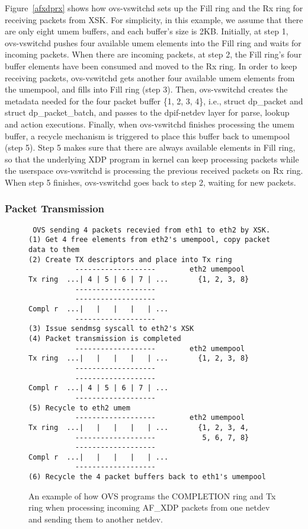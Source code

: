 \documentclass[10pt]{sigplanconf}
\begin{document}
Figure~\ref{afxdprx} shows how ovs-vswitchd sets up the Fill ring and
the Rx ring for receiving packets from XSK.  For simplicity, in this example,
we assume that there are only eight umem buffers, and each buffer's
size is 2KB.  Initially, at step 1, ovs-vswitchd pushes four available umem
elements into
the Fill ring and waits for incoming packets.  When there are incoming packets,
at step 2, the Fill ring's four buffer elements have been consumed and moved
to the Rx ring.  In order to keep receiving packets, ovs-vswitchd gets another
four available umem elements from the umempool, and fills into Fill ring (step 3).
Then, ovs-vswitchd creates the metadata needed for the four packet
buffer \{1, 2, 3, 4\}, i.e., struct dp\_packet and struct dp\_packet\_batch, and passes to 
the dpif-netdev layer for parse, lookup and action executions.
Finally, when ovs-vswitchd finishes processing the umem buffer, a recycle
mechanism is triggered to place this buffer back to umempool (step 5).
Step 5 makes sure that there are always available elements in Fill ring, so
that the underlying XDP program in kernel can keep processing packets 
while the userspace ovs-vswitchd is processing the previous
received packets on Rx ring.
When step 5 finishes, ovs-vswitchd goes back to step 2, waiting for
new packets.

\subsubsection{Packet Transmission}
\begin{figure}
{\scriptsize
\begin{verbatim}
 OVS sending 4 packets recevied from eth1 to eth2 by XSK.
(1) Get 4 free elements from eth2's umempool, copy packet data to them
(2) Create TX descriptors and place into Tx ring
           -------------------        eth2 umempool
Tx ring  ...| 4 | 5 | 6 | 7 | ...       {1, 2, 3, 8}
           -------------------
           -------------------
Compl r  ...|   |   |   |   | ...
           -------------------
(3) Issue sendmsg syscall to eth2's XSK
(4) Packet transmission is completed
           -------------------        eth2 umempool
Tx ring  ...|   |   |   |   | ...       {1, 2, 3, 8}
           -------------------
           -------------------
Compl r  ...| 4 | 5 | 6 | 7 | ...
           -------------------
(5) Recycle to eth2 umem
           -------------------        eth2 umempool
Tx ring  ...|   |   |   |   | ...       {1, 2, 3, 4,
           -------------------           5, 6, 7, 8}
           -------------------
Compl r  ...|   |   |   |   | ...
           -------------------
(6) Recycle the 4 packet buffers back to eth1's umempool
\end{verbatim}
}
\vspace{-1.0em}
\caption{An example of how OVS programs the COMPLETION ring and Tx ring when
processing incoming AF\_XDP packets from one netdev and sending them to another
netdev.}
\label{afxdptx}
\vspace{-1.0em}
\end{figure}
\end{document}

